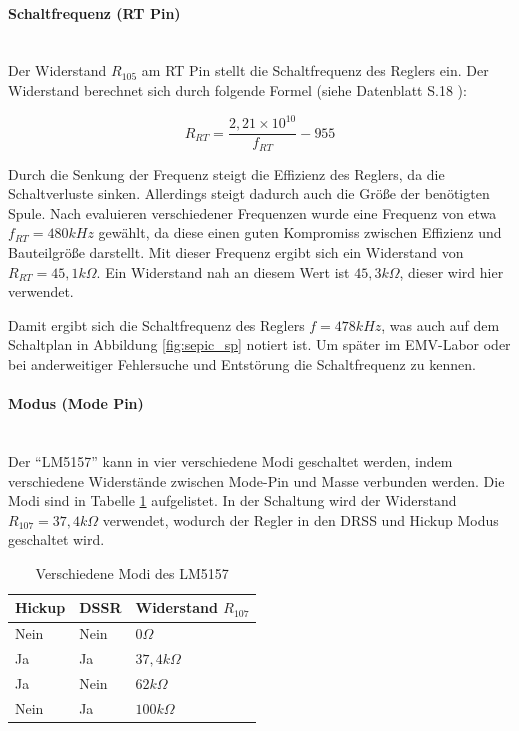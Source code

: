 \paragraph{Schaltfrequenz (RT Pin)}\mbox{}\\
Der Widerstand \(R_{105}\) am RT Pin stellt die Schaltfrequenz des Reglers ein. Der Widerstand berechnet sich durch folgende
Formel (siehe Datenblatt S.18 \cite{LM5157}):

\[R_{RT} = \frac{2,21 \times 10^{10}}{f_{RT}} - 955 \]

Durch die Senkung der Frequenz steigt die Effizienz des Reglers, da die Schaltverluste sinken. Allerdings steigt dadurch auch die
Größe der benötigten Spule. Nach evaluieren verschiedener Frequenzen wurde eine Frequenz von etwa \(f_{RT} = 480kHz\) gewählt, da 
diese einen guten Kompromiss zwischen Effizienz und Bauteilgröße darstellt. Mit dieser Frequenz ergibt sich ein Widerstand von 
\(R_{RT} = 45,1k\Omega\). Ein Widerstand nah an diesem Wert ist \(45,3k\Omega\), dieser wird hier verwendet.

Damit ergibt sich die Schaltfrequenz des Reglers \(f = 478kHz\), was auch auf dem Schaltplan in Abbildung \ref{fig:sepic_sp}
notiert ist. Um später im EMV-Labor oder bei anderweitiger Fehlersuche und Entstörung die Schaltfrequenz zu kennen.

\paragraph{Modus (Mode Pin)}\mbox{}\\
Der \enquote{LM5157} kann in vier verschiedene Modi geschaltet werden, indem verschiedene Widerstände zwischen Mode-Pin
und Masse verbunden werden. Die Modi sind in Tabelle \ref{tab:sepic_modes} aufgelistet. In der Schaltung wird der Widerstand
\(R_{107} = 37,4k\Omega\) verwendet, wodurch der Regler in den \ac{DRSS} und Hickup Modus geschaltet wird.

\begin{table}[H]
    \centering
    \begin{tabular}{|l|l|l|}
        \hline
        \textbf{Hickup} & \textbf{DSSR} & \textbf{Widerstand \(R_{107}\)} \\
        \hline
        Nein            & Nein          & \(0\Omega\)                      \\
        \hline
        Ja              & Ja            & \(37,4k\Omega\)                  \\
        \hline
        Ja              & Nein          & \(62k\Omega\)                    \\
        \hline
        Nein            & Ja            & \(100k\Omega\)                   \\
        \hline
    \end{tabular}
    \caption{Verschiedene Modi des LM5157}
    \label{tab:sepic_modes}
\end{table}

